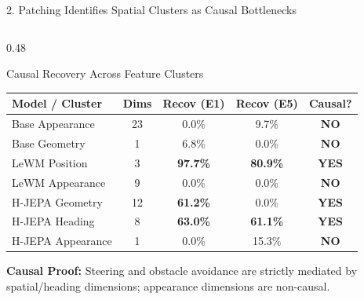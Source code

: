 \documentclass[aspectratio=169, 10pt]{beamer}
\begin{document}
\begin{frame}{2. Patching Identifies Spatial Clusters as Causal Bottlenecks}
\begin{columns}[T]
    \begin{column}{0.48\textwidth}
      \begin{block}{Causal Recovery Across Feature Clusters}
        \scriptsize
        \centering
        \setlength{\tabcolsep}{2.5pt}
        \begin{tabular}{lcccc}
          \toprule
          \textbf{Model / Cluster} & \textbf{Dims} & \textbf{Recov (E1)} & \textbf{Recov (E5)} & \textbf{Causal?} \\
          \midrule
          Base Appearance & 23 & \alert{0.0\%} & \alert{9.7\%} & \textbf{NO} \\
          Base Geometry & 1 & 6.8\% & 0.0\% & \textbf{NO} \\
          LeWM Position & 3 & \textbf{97.7\%} & \textbf{80.9\%} & \textbf{YES} \\
          LeWM Appearance & 9 & \alert{0.0\%} & \alert{0.0\%} & \textbf{NO} \\
          H-JEPA Geometry & 12 & \textbf{61.2\%} & 0.0\% & \textbf{YES} \\
          H-JEPA Heading & 8 & \textbf{63.0\%} & \textbf{61.1\%} & \textbf{YES} \\
          H-JEPA Appearance & 1 & \alert{0.0\%} & 15.3\% & \textbf{NO} \\
          \bottomrule
        \end{tabular}
      \end{block}
      \vspace{0.05cm}
      \scriptsize \textbf{Causal Proof:} Steering and obstacle avoidance are strictly mediated by spatial/heading dimensions; appearance dimensions are non-causal.
    \end{column}
  \end{columns}
\end{frame}
\end{document}
